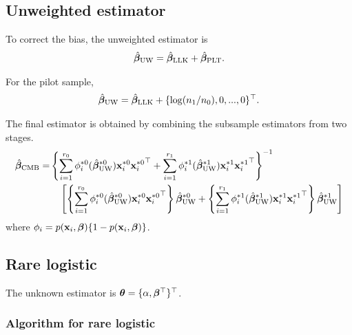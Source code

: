 \documentclass[letterpaper,12pt,hidelinks]{article}
\begin{document}
\subsection{Unweighted estimator}

To correct the bias, the unweighted estimator is 
\begin{align*}
    \hat{\boldsymbol{\beta}}_{\mathrm{UW}} = \hat{\boldsymbol{\beta}}_{\mathrm{LLK}} + \hat{\boldsymbol{\beta}}_{\mathrm{PLT}}.
\end{align*}

For the pilot sample, 
\begin{align*}
    \hat{\boldsymbol{\beta}}_{\mathrm{UW}} = \hat{\boldsymbol{\beta}}_{\mathrm{LLK}} + \{\log(n_1/n_0), 0, ..., 0\}^{\top}.
\end{align*}

The final estimator is obtained by combining the subsample estimators from two 
stages.
\begin{align*}
    \hat{\boldsymbol{\beta}}_{\mathrm{CMB}} = &\left\{\sum_{i=1}^{r_0} \phi_i^{*0}(\hat{\boldsymbol{\beta}}_{\mathrm{UW}}^{*0}) \mathbf{x}_i^{*0} {\mathbf{x}_i^{*0}}^{\top} + \sum_{i=1}^{r_1} \phi_i^{*1}(\hat{\boldsymbol{\beta}}_{\mathrm{UW}}^{*1}) \mathbf{x}_i^{*1} {\mathbf{x}_i^{*1}}^{\top}\right\}^{-1}\\
    &\quad \left[ \left\{\sum_{i=1}^{r_0} \phi_i^{*0}(\hat{\boldsymbol{\beta}}_{\mathrm{UW}}^{*0}) \mathbf{x}_i^{*0} {\mathbf{x}_i^{*0}}^{\top}\right\}\hat{\boldsymbol{\beta}}_{\mathrm{UW}}^{*0} + \left\{\sum_{i=1}^{r_1} \phi_i^{*1}(\hat{\boldsymbol{\beta}}_{\mathrm{UW}}^{*1}) \mathbf{x}_i^{*1} {\mathbf{x}_i^{*1}}^{\top}\right\}\hat{\boldsymbol{\beta}}_{\mathrm{UW}}^{*1} \right]
\end{align*}
where $\phi_i = p(\mathbf{x}_i, \boldsymbol{\beta})\{ 1 - p(\mathbf{x}_i, \boldsymbol{\beta})\}$.

\subsection{Rare logistic}

The unknown estimator is $\boldsymbol{\theta} = \{\alpha, \boldsymbol{\beta}^{\top}\}^{\top}$.

\subsubsection{Algorithm for rare logistic}
\end{document}
